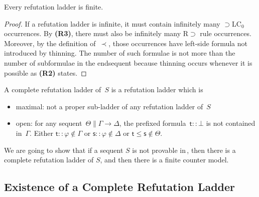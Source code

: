   \begin{proposition}
   \label{refladder-finite}
   Every refutation ladder is finite.
  \end{proposition}
  \begin{proof}
   If a refutation ladder is infinite,
   it must contain infinitely many $\supset$LC$_0$ occurrences.
   By \textbf{(R3)}, there must also be infinitely many R$\supset$ rule
   occurrences.
   Moreover, by the definition of~$\prec$,
   those occurrences have left-side formula not
   introduced by thinning.
   The number of such formulae is not more than the number of subformulae
   in the endsequent because thinning occurs whenever it is possible as
   \textbf{(R2)} states.
  \end{proof}

  \begin{definition}
   A complete refutation ladder of~$S$ is a refutation ladder which is
   \begin{itemize}
    \item maximal: not a proper sub-ladder of any
	  refutation ladder of~$S$
    \item open:
	  for any sequent~$\Theta\parallel \Gamma\longrightarrow \Delta$,
	  the prefixed formula~$\mathsf t::\bot$ is not contained in~$\Gamma$.
	  Either
	  $\mathsf t::\varphi\notin \Gamma$ or
	  $\mathsf s::\varphi\notin\Delta$ or $\mathsf t\le \mathsf s\notin
	  \Theta$.
   \end{itemize}
  \end{definition}

  We are going to show that
  if a sequent $S$ is not provable in\,\LB, then there is a complete
  refutation ladder of $S$, and then there is a finite counter model.

   \subsection{Existence of a Complete Refutation Ladder}

